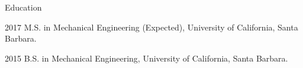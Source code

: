 \begin{vitae}

\begin{vitaesection}{Education}
\vspace{-0.1cm}
\item [2017]	M.S. in Mechanical Engineering (Expected), University of California, Santa Barbara.
\item [2015]	B.S. in Mechanical Engineering, University of California, Santa Barbara.
\end{vitaesection}



\end{vitae}